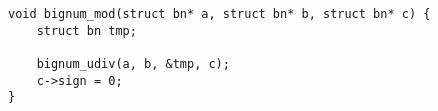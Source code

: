 \begin{lstlisting}[basicstyle=\ttfamily\small, backgroundcolor=\color{bgCode}]
void bignum_mod(struct bn* a, struct bn* b, struct bn* c) {
    struct bn tmp;
    
    bignum_udiv(a, b, &tmp, c);
    c->sign = 0;
}
\end{lstlisting}
















































